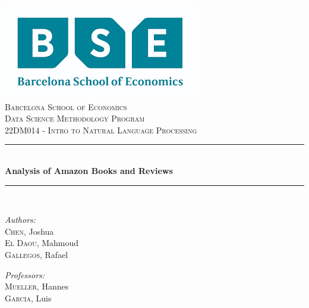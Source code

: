 \documentclass[12pt]{article}
\date{\today}							%
\numberwithin{equation}{section}
\begin{document}
\begin{titlepage}
	\centering
    \includegraphics[scale = 0.7]{bse_logo.png}\\[1.2 cm]	%
    \textsc{\LARGE Barcelona School of Economics}\\[2.0 cm]	%
	\textsc{\Large Data Science Methodology Program}\\[0.5 cm]				%
	\textsc{\large 22DM014 - Intro to Natural Language Processing }\\[0.5 cm]				%
	\rule{\linewidth}{0.2 mm} \\[0.4 cm]
	{ \huge \bfseries Analysis of Amazon Books and Reviews }\\
	\rule{ \linewidth}{0.2 mm} \\[1.5 cm]
	
\begin{center}
    
{ \emph{Authors: }\\
    \textsc{Chen}, Joshua \\
    \textsc{El Daou}, Mahmoud \\ 
    \textsc{Gallegos}, Rafael \\} 

\vspace{0.7cm}


    \textit{Professors:}\\  \textsc{Mueller}, Hannes \\
    	\textsc{Garcia}, Luis
        \\ \vspace{0.5cm}


\vspace{1.7cm}


 \end{center}
	\vfill
	
\end{titlepage}
	
\tableofcontents
\vspace{1cm}
\listoffigures
\listoftables
\pagebreak

\newpage
\end{document}
